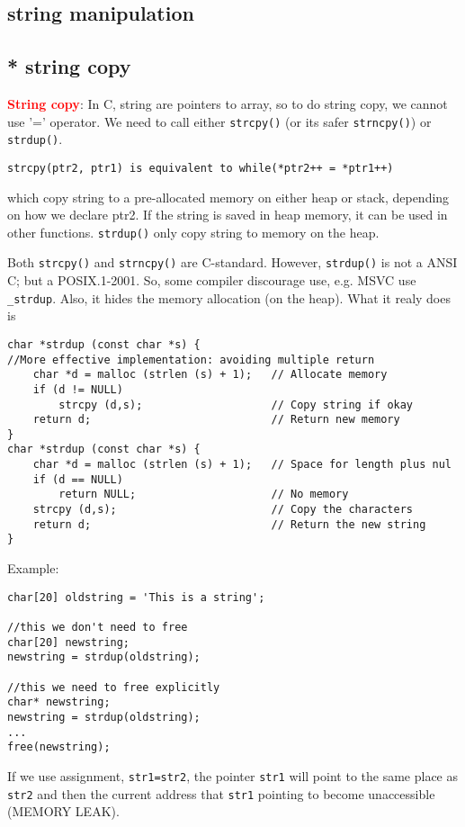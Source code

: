 \subsection{ string manipulation}
\label{sec:string-manipulation-C}

\subsection{* string copy}

\textcolor{red}{\bf String copy}: In C, string are pointers to array, so to do
string copy, we cannot use '=' operator. We need to call either
\verb!strcpy()! (or its safer \verb!strncpy()!) or \verb!strdup()!.

\begin{verbatim}
strcpy(ptr2, ptr1) is equivalent to while(*ptr2++ = *ptr1++)
\end{verbatim}
which copy string to a pre-allocated memory on either heap or stack, depending
on how we declare ptr2. If the string is saved in heap
memory, it can be used in other functions. \verb!strdup()! only copy string to
memory on the heap.

Both \verb!strcpy()! and \verb!strncpy()! are C-standard. However,
\verb!strdup()! is not a ANSI C; but a POSIX.1-2001. So, some compiler
discourage use, e.g. MSVC use \verb!_strdup!. Also, it hides the memory
allocation (on the heap). What it  realy does is
\begin{verbatim}
char *strdup (const char *s) {
//More effective implementation: avoiding multiple return
    char *d = malloc (strlen (s) + 1);   // Allocate memory
    if (d != NULL)
        strcpy (d,s);                    // Copy string if okay
    return d;                            // Return new memory
}
char *strdup (const char *s) {
    char *d = malloc (strlen (s) + 1);   // Space for length plus nul
    if (d == NULL)
        return NULL;                     // No memory
    strcpy (d,s);                        // Copy the characters
    return d;                            // Return the new string
}
\end{verbatim}

Example:
\begin{verbatim}
char[20] oldstring = 'This is a string';

//this we don't need to free
char[20] newstring;
newstring = strdup(oldstring);

//this we need to free explicitly
char* newstring;
newstring = strdup(oldstring);
...
free(newstring);
\end{verbatim}
If we use assignment, \verb!str1=str2!, the pointer \verb!str1! will point to
the same place as \verb!str2! and then the current address that \verb!str1!
pointing to become unaccessible (MEMORY LEAK). 

